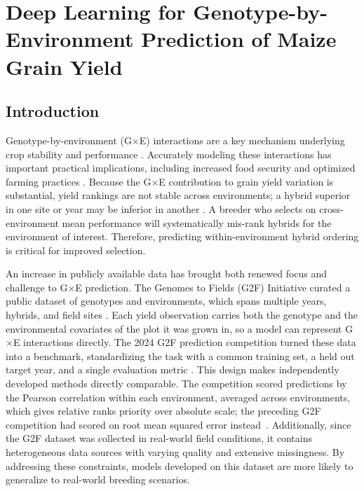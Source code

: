 \chapter{Deep Learning for Genotype-by-Environment Prediction of Maize Grain Yield}\label{ch3:gxe}

\section{Introduction}
Genotype-by-environment (G$\times$E) interactions are a key mechanism underlying crop stability and performance \cite{lopez2023leveraging,rogers2021importance}. Accurately modeling these interactions has important practical implications, including increased food security and optimized farming practices \cite{ray2013yield}. Because the G$\times$E contribution to grain yield variation is substantial, yield rankings are not stable across environments; a hybrid superior in one site or year may be inferior in another \cite{rogers2021importance,lopez2023leveraging}. A breeder who selects on cross-environment mean performance will systematically mis-rank hybrids for the environment of interest. Therefore, predicting within-environment hybrid ordering is critical for improved selection.

An increase in publicly available data has brought both renewed focus and challenge to G$\times$E prediction. The Genomes to Fields (G2F) Initiative curated a public dataset of genotypes and environments, which spans multiple years, hybrids, and field sites \cite{lopez2023leveraging}. Each yield observation carries both the genotype and the environmental covariates of the plot it was grown in, so a model can represent G$\times$E interactions directly. The 2024 G2F prediction competition turned these data into a benchmark, standardizing the task with a common training set, a held out target year, and a single evaluation metric \cite{g2f-2024-competition}. This design makes independently developed methods directly comparable. The competition scored predictions by the Pearson correlation within each environment, averaged across environments, which gives relative ranks priority over absolute scale; the preceding G2F competition had scored on root mean squared error instead~\cite{batista2026competition, g2f-maize-2025}. Additionally, since the G2F dataset was collected in real-world field conditions, it contains heterogeneous data sources with varying quality and extensive missingness. By addressing these constraints, models developed on this dataset are more likely to generalize to real-world breeding scenarios.


